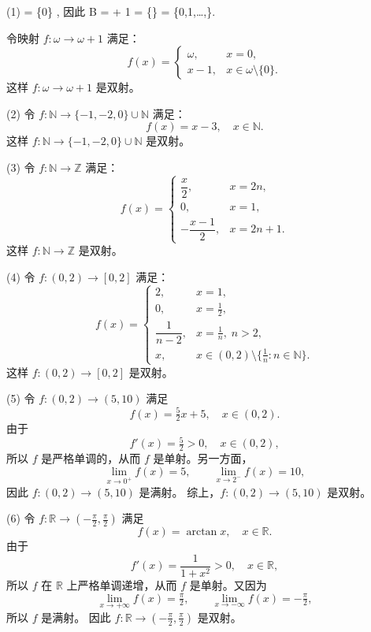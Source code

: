 \begin{solution}
(1) \; \omega = \{0\} \cup {}, \; 因此 \; B = \omega + 1 = \omega \cup \{\omega\} = \{0,1,\dots,\omega\}.  

令映射 $f:\omega \to \omega+1$ 满足：  
\[
f(x) =
\begin{cases}
\omega, & x=0, \\
x-1, & x \in \omega \setminus \{0\}.
\end{cases}
\]
这样 $f:\omega \to \omega+1$ 是双射。

\medskip

(2) 令 $f:\mathbb{N} \to \{-1,-2,0\}\cup \mathbb{N}$ 满足：  
\[
f(x) = x-3, \quad x \in \mathbb{N}.
\]
这样 $f:\mathbb{N} \to \{-1,-2,0\}\cup \mathbb{N}$ 是双射。

\medskip

(3) 令 $f:\mathbb{N} \to \mathbb{Z}$ 满足：  
\[
f(x) =
\begin{cases}
\dfrac{x}{2}, & x=2n, \\
0, & x=1, \\
-\dfrac{x-1}{2}, & x=2n+1.
\end{cases}
\]
这样 $f:\mathbb{N}\to\mathbb{Z}$ 是双射。
\end{solution}

\begin{solution}
(4) 令 $f : (0,2) \to [0,2]$ 满足：
\[
f(x) =
\begin{cases}
2, & x = 1, \\
0, & x = \tfrac{1}{2}, \\
\dfrac{1}{n-2}, & x = \tfrac{1}{n}, \; n>2, \\
x, & x \in (0,2)\setminus \bigl\{\tfrac{1}{n}: n \in \mathbb{N}\bigr\}.
\end{cases}
\]
这样 $f : (0,2) \to [0,2]$ 是双射。
\end{solution}

\begin{solution}
(5) 令 $f : (0,2) \to (5,10)$ 满足
\[
f(x) = \tfrac{5}{2}x + 5, \quad x \in (0,2).
\]
由于
\[
f'(x) = \tfrac{5}{2} > 0, \quad x \in (0,2),
\]
所以 $f$ 是严格单调的，从而 $f$ 是单射。另一方面，
\[
\lim_{x \to 0^+} f(x) = 5, \qquad \lim_{x \to 2^-} f(x) = 10,
\]
因此 $f : (0,2) \to (5,10)$ 是满射。  
综上，$f : (0,2) \to (5,10)$ 是双射。

\vspace{1em}

(6) 令 $f : \mathbb{R} \to \left(-\tfrac{\pi}{2}, \tfrac{\pi}{2}\right)$ 满足
\[
f(x) = \arctan x, \quad x \in \mathbb{R}.
\]
由于
\[
f'(x) = \frac{1}{1+x^2} > 0, \quad x \in \mathbb{R},
\]
所以 $f$ 在 $\mathbb{R}$ 上严格单调递增，从而 $f$ 是单射。又因为
\[
\lim_{x \to +\infty} f(x) = \tfrac{\pi}{2}, \qquad
\lim_{x \to -\infty} f(x) = -\tfrac{\pi}{2},
\]
所以 $f$ 是满射。  
因此 $f : \mathbb{R} \to \left(-\tfrac{\pi}{2}, \tfrac{\pi}{2}\right)$ 是双射。
\end{solution}

